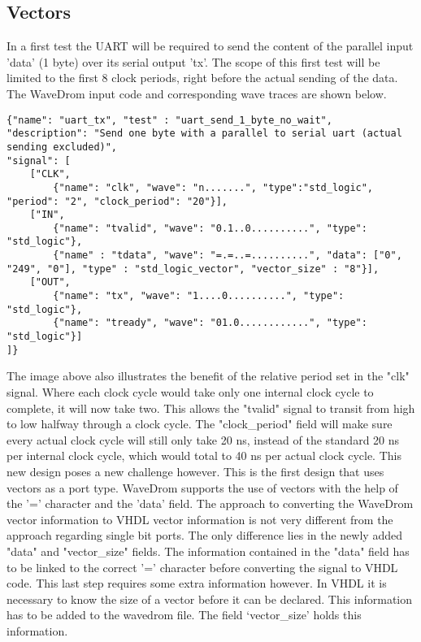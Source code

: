\subsection{Vectors}
In a first test the UART will be required to send the content of the parallel input 'data' (1 byte) over its serial output 'tx'. The scope of this first test will be limited to the first 8 clock periods, right before the actual sending of the data. The WaveDrom input code and corresponding wave traces are shown below.
\begin{lstlisting}[style=json, caption={Source file for creating the first transmission test for the UART design in \ref{appendix:uart}}, label={json:uart_no_wait}]
{"name": "uart_tx", "test" : "uart_send_1_byte_no_wait", 
"description": "Send one byte with a parallel to serial uart (actual sending excluded)", 
"signal": [
	["CLK",
		{"name": "clk", "wave": "n.......", "type":"std_logic", "period": "2", "clock_period": "20"}],
	["IN",
		{"name": "tvalid", "wave": "0.1..0..........", "type": "std_logic"},
		{"name" : "tdata", "wave": "=.=..=..........", "data": ["0", "249", "0"], "type" : "std_logic_vector", "vector_size" : "8"}],
	["OUT",
		{"name": "tx", "wave": "1....0..........", "type": "std_logic"},
		{"name": "tready", "wave": "01.0............", "type": "std_logic"}]
]}
\end{lstlisting}\noindent
{}\newpage\noindent
The image above also illustrates the benefit of the relative period set in the "clk" signal. Where each clock cycle would take only one internal clock cycle to complete, it will now take two. This allows the "tvalid" signal to transit from high to low halfway through a clock cycle. The "clock\_period" field will make sure every actual clock cycle will still only take 20 ns, instead of the standard 20 ns per internal clock cycle, which would total to 40 ns per actual clock cycle. 
\npar
This new design poses a new challenge however. This is the first design that uses vectors as a port type. WaveDrom supports the use of vectors with the help of the '=' character and the 'data' field. The approach to converting the WaveDrom vector information to VHDL vector information is not very different from the approach regarding single bit ports. The only difference lies in the newly added "data" and "vector\_size" fields. The information contained in the "data" field has to be linked to the correct '=' character before converting the signal to VHDL code. This last step requires some extra information however. In VHDL it is necessary to know the size of a vector before it can be declared. This information has to be added to the wavedrom file. The field ‘vector\_size’ holds this information.
\newpage
